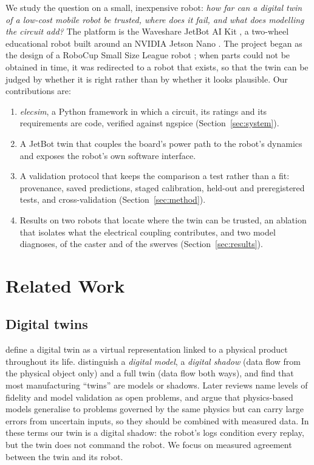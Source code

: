 \documentclass[conference,a4paper]{IEEEtran}
\begin{document}
We study the question on a small, inexpensive robot: \emph{how far can a
digital twin of a low-cost mobile robot be trusted, where does it fail, and
what does modelling the circuit add?} The platform is the Waveshare JetBot
AI Kit \citep{waveshare2020jetbot}, a two-wheel educational robot built
around an NVIDIA Jetson Nano \citep{nvidia2019jetbot}. The project began as
the design of a RoboCup Small Size League robot \citep{kitano1997robocup};
when parts could not be obtained in time, it was redirected to a robot that
exists, so that the twin can be judged by whether it is right rather than by
whether it looks plausible. Our contributions are:
\begin{enumerate}
\item \emph{elecsim}, a Python framework in which a circuit, its ratings and
  its requirements are code, verified against ngspice (Section~\ref{sec:system}).
\item A JetBot twin that couples the board's power path to the robot's
  dynamics and exposes the robot's own software interface.
\item A validation protocol that keeps the comparison a test rather than a
  fit: provenance, saved predictions, staged calibration, held-out and
  preregistered tests, and cross-validation (Section~\ref{sec:method}).
\item Results on two robots that locate where the twin can be trusted, an
  ablation that isolates what the electrical coupling contributes, and two
  model diagnoses, of the caster and of the swerves (Section~\ref{sec:results}).
\end{enumerate}

\section{Related Work}\label{sec:related}

\subsection{Digital twins}
\citet{grieves2017digital} define a digital twin as a virtual representation
linked to a physical product throughout its life. \citet{kritzinger2018digital}
distinguish a \emph{digital model}, a \emph{digital shadow} (data flow from
the physical object only) and a full twin (data flow both ways), and find
that most manufacturing ``twins'' are models or shadows. Later reviews
name levels of fidelity \citep{jones2020characterising} and model validation
\citep{fuller2020digital} as open problems, and \citet{rasheed2020digital}
argue that physics-based models generalise to problems governed by the same
physics but can carry large errors from uncertain inputs, so they should be
combined with measured data. In these terms our twin is a
digital shadow: the robot's logs condition every replay, but the twin does
not command the robot. We focus on measured agreement between the twin and
its robot.
\end{document}
